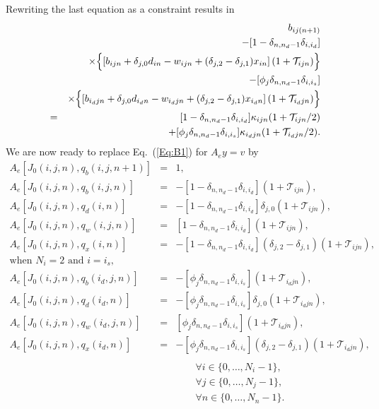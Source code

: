 \documentclass[fleqn,12pt]{report}
\begin{document}
Rewriting the last equation as a constraint results in
\begin{eqnarray}
	&&b_{ij(n+1)} 
	  \nonumber  \\
	&& - [1 - \delta_{n, n_d-1}\delta_{i, i_d}] \nonumber\\
	&& \times \Bigl\{ \left[b_{ijn} + \delta_{j, 0}d_{in} - w_{ijn}
	+ (\delta_{j, 2} - \delta_{j, 1})x_{in} \right](1 + \mathcal{T}_{ijn}) \Bigr\}
	\nonumber \\
	&&- [\phi_j\delta_{n, n_d-1}\delta_{i, i_s}] \nonumber \\
	&& \times \Bigl\{ \left[b_{i_djn} + \delta_{j, 0}d_{i_dn} - w_{i_djn}
	+ (\delta_{j, 2} - \delta_{j, 1})x_{i_dn}
	\right](1 + \mathcal{T}_{i_djn})
	\Bigr\}
	\nonumber \\
	&=& [1 - \delta_{n, n_d-1}\delta_{i, i_d}] \kappa_{ijn} (1 + \mathcal{T}_{ijn}/2)
	\nonumber\\ &&
	+ [\phi_j\delta_{n, n_d-1}\delta_{i, i_s}]
	\kappa_{i_djn}(1 + \mathcal{T}_{i_djn}/2).
\end{eqnarray}
We are now ready to replace Eq.~(\ref{Eq:B1}) for $A_ey = v$ by
\begin{eqnarray}
        \label{Eq:B2}
        A_e[J_0(i, j, n), q_b(i, j, n+1)] &=& 1, \nonumber \\
        A_e[J_0(i, j, n), q_b(i, j, n)] &=& - [1 - \delta_{n, n_d-1}\delta_{i, i_d}]
		(1 + \mathcal{T}_{ijn}), \nonumber \\
        A_e[J_0(i, j, n), q_d(i, n)] &=& - [1 - \delta_{n, n_d-1}\delta_{i, i_d}]
		\delta_{j, 0} (1 + \mathcal{T}_{ijn}), \nonumber \\
        A_e[J_0(i, j, n), q_w(i, j, n)] &=& [1 - \delta_{n, n_d-1}\delta_{i, i_d}]
	(1 + \mathcal{T}_{ijn}),\nonumber \\
        A_e[J_0(i, j, n), q_x(i, n)] &=& - [1 - \delta_{n, n_d-1}\delta_{i, i_d}]
                (\delta_{j, 2} - \delta_{j, 1})
		(1 + \mathcal{T}_{ijn}), \nonumber \\
		\text{when $N_i =2$ and $i = i_s$,} && \nonumber\\
        A_e[J_0(i, j, n), q_b(i_d, j, n)] &=& - [\phi_j\delta_{n, n_d-1}\delta_{i, i_s}]
		(1 + \mathcal{T}_{i_djn}), \nonumber \\
        A_e[J_0(i, j, n), q_d(i_d, n)] &=&  -[\phi_j\delta_{n, n_d-1}\delta_{i, i_s}]
		\delta_{j, 0}(1 + \mathcal{T}_{i_djn}), \nonumber \\
        A_e[J_0(i, j, n), q_w(i_d, j, n)] &=& [\phi_j\delta_{n, n_d-1}\delta_{i, i_s}]
	(1 + \mathcal{T}_{i_djn}), \nonumber\\
        A_e[J_0(i, j, n), q_x(i_d, n)] &=& - [\phi_j\delta_{n, n_d-1}\delta_{i, i_s}]
                (\delta_{j, 2} - \delta_{j, 1})
		(1 + \mathcal{T}_{i_djn}), \nonumber \\
                \nonumber \\
        &&\qquad\forall i \in \{0,\ldots, N_i-1\},\nonumber\\
        &&\qquad\forall j \in \{0,\ldots, N_j-1\},\nonumber\\
        &&\qquad\forall n \in \{0,\ldots, N_n-1\}.
\end{eqnarray}
\end{document}
